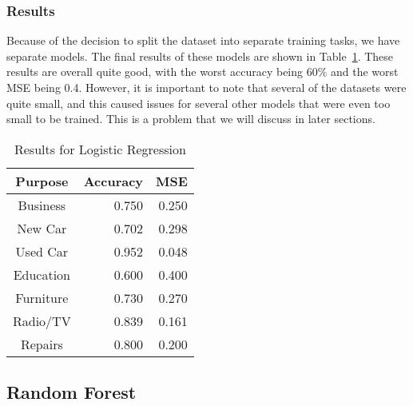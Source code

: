 \documentclass[12pt,twocolumn]{article}
\begin{document}
\subsubsection{Results}
Because of the decision to split the dataset into  separate training tasks, we have separate models. The final results of these models are shown in Table~\ref{tab:logistic_regression_results}. These results are overall quite good, with the worst accuracy being 60\% and the worst MSE being 0.4. However, it is important to note that several of the datasets were quite small, and this caused issues for several other models that were even too small to be trained. This is a problem that we will discuss in later sections.

\begin{table}
    \centering
    \begin{tabular}{|c|r|r|}
        \hline
        Purpose & Accuracy & MSE \\
        \hline
        \hline
        Business & 0.750 & 0.250 \\
        \hline
        New Car & 0.702 & 0.298 \\
        \hline
        Used Car & 0.952 & 0.048 \\
        \hline
        Education & 0.600 & 0.400 \\
        \hline
        Furniture & 0.730 & 0.270 \\
        \hline
        Radio/TV & 0.839 & 0.161 \\
        \hline
        Repairs & 0.800 & 0.200 \\
        \hline
    \end{tabular}
    \caption{Results for Logistic Regression}\label{tab:logistic_regression_results}
\end{table}

\subsection{Random Forest}
\end{document}
